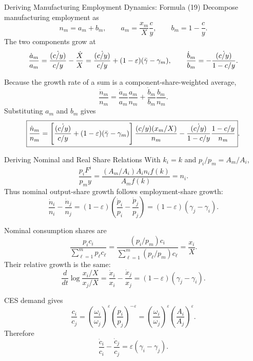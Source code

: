 \begin{frame}[label=appendixmanufacturing]{Deriving Manufacturing Employment Dynamics: Formula (19)}
  \scriptsize
  Decompose manufacturing employment as
  \[
    n_m=a_m+b_m,\qquad
    a_m=\frac{x_m}{X}\frac{c}{y},\qquad
    b_m=1-\frac{c}{y}.
  \]
  The two components grow at
  \[
    \frac{\dot a_m}{a_m}
    =
    \frac{\dot{(c/y)}}{c/y}-\frac{\dot X}{X}
    =
    \frac{\dot{(c/y)}}{c/y}
    +(1-\varepsilon)(\bar{\gamma}-\gamma_m),
    \qquad
    \frac{\dot b_m}{b_m}
    =
    -\frac{\dot{(c/y)}}{1-c/y}.
  \]

  Because the growth rate of a sum is a component-share-weighted average,
  \[
    \frac{\dot n_m}{n_m}
    =
    \frac{\dot a_m}{a_m}\frac{a_m}{n_m}
    +
    \frac{\dot b_m}{b_m}\frac{b_m}{n_m}.
  \]
  Substituting $a_m$ and $b_m$ gives
  \[
    \boxed{
    \frac{\dot n_m}{n_m}
    =
    \left[
    \frac{\dot{(c/y)}}{c/y}
    +(1-\varepsilon)(\bar{\gamma}-\gamma_m)
    \right]\frac{(c/y)(x_m/X)}{n_m}
    -\frac{\dot{(c/y)}}{1-c/y}\frac{1-c/y}{n_m}} .
  \]

  \hyperlink{individualdynamics}{}
\end{frame}

\begin{frame}[label=appendixnominal]{Deriving Nominal and Real Share Relations}
  \scriptsize
  With $k_i=k$ and $p_i/p_m=A_m/A_i$,
  \[
    \frac{p_iF^i}{p_my}
    =
    \frac{(A_m/A_i)A_in_if(k)}{A_mf(k)}
    =
    \boxed{n_i}.
  \]
  Thus nominal output-share growth follows employment-share growth:
  \[
    \frac{\dot n_i}{n_i}-\frac{\dot n_j}{n_j}
    =
    (1-\varepsilon)
    \left(\frac{\dot p_i}{p_i}-\frac{\dot p_j}{p_j}\right)
    =
    (1-\varepsilon)(\gamma_j-\gamma_i).
  \]

  Nominal consumption shares are
  \[
    \frac{p_ic_i}{\sum_{\ell=1}^m p_\ell c_\ell}
    =
    \frac{(p_i/p_m)c_i}{\sum_{\ell=1}^m(p_\ell/p_m)c_\ell}
    =
    \boxed{\frac{x_i}{X}} .
  \]
  Their relative growth is the same:
  \[
    \frac{d}{dt}\log\frac{x_i/X}{x_j/X}
    =
    \frac{\dot x_i}{x_i}-\frac{\dot x_j}{x_j}
    =
    (1-\varepsilon)(\gamma_j-\gamma_i).
  \]

  CES demand gives
  \[
    \frac{c_i}{c_j}
    =
    \left(\frac{\omega_i}{\omega_j}\right)^\varepsilon
    \left(\frac{p_i}{p_j}\right)^{-\varepsilon}
    =
    \left(\frac{\omega_i}{\omega_j}\right)^\varepsilon
    \left(\frac{A_i}{A_j}\right)^\varepsilon .
  \]
  Therefore
  \[
    \boxed{
    \frac{\dot c_i}{c_i}-\frac{\dot c_j}{c_j}
    =
    \varepsilon(\gamma_i-\gamma_j)} .
  \]

  \hyperlink{nominalshares}{}
\end{frame}

